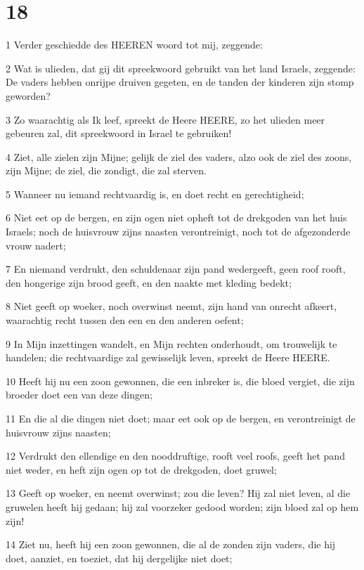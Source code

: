 \chapter{18}

\par 1 Verder geschiedde des HEEREN woord tot mij, zeggende:
\par 2 Wat is ulieden, dat gij dit spreekwoord gebruikt van het land Israels, zeggende: De vaders hebben onrijpe druiven gegeten, en de tanden der kinderen zijn stomp geworden?
\par 3 Zo waarachtig als Ik leef, spreekt de Heere HEERE, zo het ulieden meer gebeuren zal, dit spreekwoord in Israel te gebruiken!
\par 4 Ziet, alle zielen zijn Mijne; gelijk de ziel des vaders, alzo ook de ziel des zoons, zijn Mijne; de ziel, die zondigt, die zal sterven.
\par 5 Wanneer nu iemand rechtvaardig is, en doet recht en gerechtigheid;
\par 6 Niet eet op de bergen, en zijn ogen niet opheft tot de drekgoden van het huis Israels; noch de huisvrouw zijns naasten verontreinigt, noch tot de afgezonderde vrouw nadert;
\par 7 En niemand verdrukt, den schuldenaar zijn pand wedergeeft, geen roof rooft, den hongerige zijn brood geeft, en den naakte met kleding bedekt;
\par 8 Niet geeft op woeker, noch overwinst neemt, zijn hand van onrecht afkeert, waarachtig recht tussen den een en den anderen oefent;
\par 9 In Mijn inzettingen wandelt, en Mijn rechten onderhoudt, om trouwelijk te handelen; die rechtvaardige zal gewisselijk leven, spreekt de Heere HEERE.
\par 10 Heeft hij nu een zoon gewonnen, die een inbreker is, die bloed vergiet, die zijn broeder doet een van deze dingen;
\par 11 En die al die dingen niet doet; maar eet ook op de bergen, en verontreinigt de huisvrouw zijns naasten;
\par 12 Verdrukt den ellendige en den nooddruftige, rooft veel roofs, geeft het pand niet weder, en heft zijn ogen op tot de drekgoden, doet gruwel;
\par 13 Geeft op woeker, en neemt overwinst; zou die leven? Hij zal niet leven, al die gruwelen heeft hij gedaan; hij zal voorzeker gedood worden; zijn bloed zal op hem zijn!
\par 14 Ziet nu, heeft hij een zoon gewonnen, die al de zonden zijn vaders, die hij doet, aanziet, en toeziet, dat hij dergelijke niet doet;
